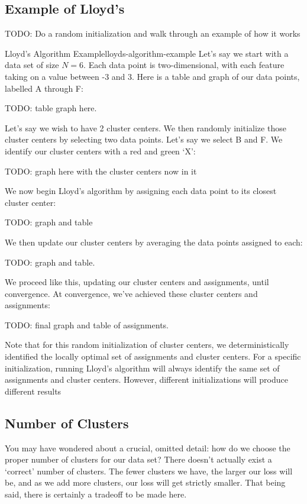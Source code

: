 \subsection{Example of Lloyd's}
TODO: Do a random initialization and walk through an example of how it works

\begin{example}{Lloyd's Algorithm Example}{lloyds-algorithm-example}
	Let's say we start with a data set of size $N=6$. Each data point is two-dimensional, with each feature taking on a value between -3 and 3. Here is a table and graph of our data points, labelled A through F:

	TODO: table graph here.

	Let's say we wish to have 2 cluster centers. We then randomly initialize those cluster centers by selecting two data points. Let's say we select B and F. We identify our cluster centers with a red and green `X':

	TODO: graph here with the cluster centers now in it

	We now begin Lloyd's algorithm by assigning each data point to its closest cluster center:

	TODO: graph and table

	We then update our cluster centers by averaging the data points assigned to each:

	TODO: graph and table.

	We proceed like this, updating our cluster centers and assignments, until convergence. At convergence, we've achieved these cluster centers and assignments:

	TODO: final graph and table of assignments.

	Note that for this random initialization of cluster centers, we deterministically identified the locally optimal set of assignments and cluster centers. For a specific initialization, running Lloyd's algorithm will always identify the same set of assignments and cluster centers. However, different initializations will produce different results
\end{example}

\subsection{Number of Clusters}
You may have wondered about a crucial, omitted detail: how do we choose the proper number of clusters for our data set? There doesn't actually exist a `correct' number of clusters. The fewer clusters we have, the larger our loss will be, and as we add more clusters, our loss will get strictly smaller. That being said, there is certainly a tradeoff to be made here.

